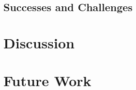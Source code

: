 \documentclass[sigconf]{acmart}
\begin{document}
\subsection{Successes and Challenges}

\section{Discussion}

\section{Future Work}
\end{document}
